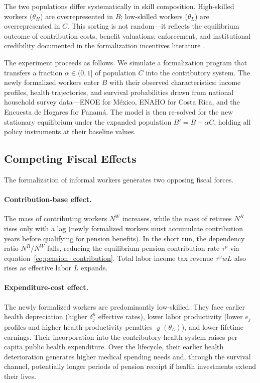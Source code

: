 \documentclass[12pt,a4paper]{article}
\begin{document}
The two populations differ systematically in skill composition. High-skilled workers ($\theta_H$) are overrepresented in $B$; low-skilled workers ($\theta_L$) are overrepresented in $C$. This sorting is not random---it reflects the equilibrium outcome of contribution costs, benefit valuations, enforcement, and institutional credibility documented in the formalization incentives literature \citep{WorldBankInformalizing2025, BoschMelguizoPages2013}.

The experiment proceeds as follows. We simulate a formalization program that transfers a fraction $\alpha \in (0, 1]$ of population $C$ into the contributory system. The newly formalized workers enter $B$ with their observed characteristics: income profiles, health trajectories, and survival probabilities drawn from national household survey data---ENOE for M\'exico, ENAHO for Costa Rica, and the Encuesta de Hogares for Panam\'a. The model is then re-solved for the new stationary equilibrium under the expanded population $B' = B + \alpha C$, holding all policy instruments at their baseline values.

\subsection{Competing Fiscal Effects}
\label{subsec:form_effects}

The formalization of informal workers generates two opposing fiscal forces.

\paragraph{Contribution-base effect.} The mass of contributing workers $N^W$ increases, while the mass of retirees $N^R$ rises only with a lag (newly formalized workers must accumulate contribution years before qualifying for pension benefits). In the short run, the dependency ratio $N^R/N^W$ falls, reducing the equilibrium pension contribution rate $\tau^p$ via equation~\eqref{eq:pension_contribution}. Total labor income tax revenue $\tau^\omega w L$ also rises as effective labor $L$ expands.

\paragraph{Expenditure-cost effect.} The newly formalized workers are predominantly low-skilled. They face earlier health depreciation (higher $\delta_j^h$ effective rates), lower labor productivity (lower $e_j$ profiles and higher health-productivity penalties $\varrho(\theta_L)$), and lower lifetime earnings. Their incorporation into the contributory health system raises per-capita public health expenditure. Over the lifecycle, their earlier health deterioration generates higher medical spending needs and, through the survival channel, potentially longer periods of pension receipt if health investments extend their lives.
\end{document}
